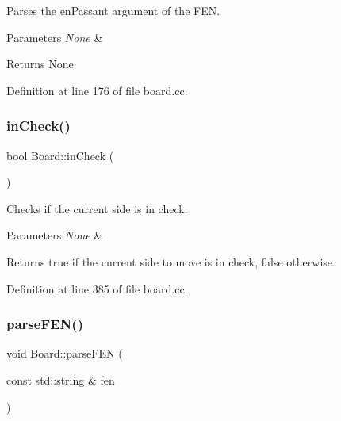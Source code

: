 Parses the en\+Passant argument of the F\+EN. 


\begin{DoxyParams}{Parameters}
{\em None} & \\
\hline
\end{DoxyParams}
\begin{DoxyReturn}{Returns}
None 
\end{DoxyReturn}


Definition at line 176 of file board.\+cc.

\mbox{\label{classBoard_a05bfcc94444986be0ae0f2ad694d629a}} 
\subsubsection{\texorpdfstring{in\+Check()}{inCheck()}}
{\footnotesize\ttfamily bool Board\+::in\+Check (\begin{DoxyParamCaption}{ }\end{DoxyParamCaption})\hspace{0.3cm}{\ttfamily [noexcept]}}



Checks if the current side is in check. 


\begin{DoxyParams}{Parameters}
{\em None} & \\
\hline
\end{DoxyParams}
\begin{DoxyReturn}{Returns}
true if the current side to move is in check, false otherwise. 
\end{DoxyReturn}


Definition at line 385 of file board.\+cc.

\mbox{\label{classBoard_a7cab67d5057bca8aeeb54a3cb84a1580}} 
\subsubsection{\texorpdfstring{parse\+F\+E\+N()}{parseFEN()}}
{\footnotesize\ttfamily void Board\+::parse\+F\+EN (\begin{DoxyParamCaption}\item[{const std\+::string \&}]{fen }\end{DoxyParamCaption})\hspace{0.3cm}{\ttfamily [noexcept]}}



